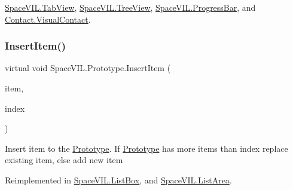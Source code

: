 \mbox{\hyperlink{class_space_v_i_l_1_1_tab_view_ae19ec535e78dee9eca9ac433e2b2bca5}{Space\+V\+I\+L.\+Tab\+View}}, \mbox{\hyperlink{class_space_v_i_l_1_1_tree_view_ac44a1df7d58a35e35842170162645e08}{Space\+V\+I\+L.\+Tree\+View}}, \mbox{\hyperlink{class_space_v_i_l_1_1_progress_bar_a61f9a8602172eebf205ed6eee8cb3e30}{Space\+V\+I\+L.\+Progress\+Bar}}, and \mbox{\hyperlink{class_contact_1_1_visual_contact_a975573507e5e287632273df844dc7792}{Contact.\+Visual\+Contact}}.

\mbox{\label{class_space_v_i_l_1_1_prototype_a9dd004dfa4ca2ea37c21770a24434270}} 
\subsubsection{\texorpdfstring{Insert\+Item()}{InsertItem()}}
{\footnotesize\ttfamily virtual void Space\+V\+I\+L.\+Prototype.\+Insert\+Item (\begin{DoxyParamCaption}\item[{\mbox{\hyperlink{interface_space_v_i_l_1_1_core_1_1_i_base_item}{I\+Base\+Item}}}]{item,  }\item[{Int32}]{index }\end{DoxyParamCaption})\hspace{0.3cm}{\ttfamily [virtual]}}



Insert item to the \mbox{\hyperlink{class_space_v_i_l_1_1_prototype}{Prototype}}. If \mbox{\hyperlink{class_space_v_i_l_1_1_prototype}{Prototype}} has more items than index replace existing item, else add new item 



Reimplemented in \mbox{\hyperlink{class_space_v_i_l_1_1_list_box_a3d5da8acbfd4f0bb11594b5f4b9001c0}{Space\+V\+I\+L.\+List\+Box}}, and \mbox{\hyperlink{class_space_v_i_l_1_1_list_area_a44efda800a4a280b7a452bd09c90f484}{Space\+V\+I\+L.\+List\+Area}}.

\mbox{\label{class_space_v_i_l_1_1_prototype_ad370acd0c610b7a7dc6d402b0cccf09a}} 
